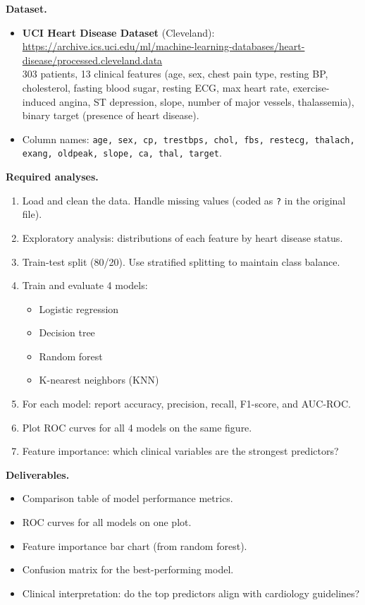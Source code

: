 \textbf{Dataset.}
\begin{itemize}
  \item \textbf{UCI Heart Disease Dataset} (Cleveland):\\
  \url{https://archive.ics.uci.edu/ml/machine-learning-databases/heart-disease/processed.cleveland.data}\\
  303 patients, 13 clinical features (age, sex, chest pain type, resting BP, cholesterol, fasting blood sugar, resting ECG, max heart rate, exercise-induced angina, ST depression, slope, number of major vessels, thalassemia), binary target (presence of heart disease).
  \item Column names: \texttt{age, sex, cp, trestbps, chol, fbs, restecg, thalach, exang, oldpeak, slope, ca, thal, target}.
\end{itemize}

\textbf{Required analyses.}
\begin{enumerate}
  \item Load and clean the data. Handle missing values (coded as \texttt{?} in the original file).
  \item Exploratory analysis: distributions of each feature by heart disease status.
  \item Train-test split (80/20). Use stratified splitting to maintain class balance.
  \item Train and evaluate 4 models:
  \begin{itemize}
    \item Logistic regression
    \item Decision tree
    \item Random forest
    \item K-nearest neighbors (KNN)
  \end{itemize}
  \item For each model: report accuracy, precision, recall, F1-score, and AUC-ROC.
  \item Plot ROC curves for all 4 models on the same figure.
  \item Feature importance: which clinical variables are the strongest predictors?
\end{enumerate}

\textbf{Deliverables.}
\begin{itemize}
  \item Comparison table of model performance metrics.
  \item ROC curves for all models on one plot.
  \item Feature importance bar chart (from random forest).
  \item Confusion matrix for the best-performing model.
  \item Clinical interpretation: do the top predictors align with cardiology guidelines?
\end{itemize}

